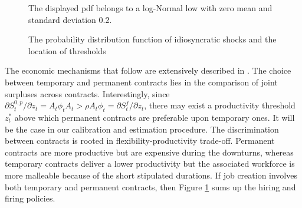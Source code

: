 \begin{figure}[t]
\begin{center}
\end{center}
\caption{The probability distribution function of idiosyncratic shocks and the location of thresholds}
\begin{flushleft}
\small The displayed pdf belongs to a log-Normal low with zero mean and standard deviation 0.2. \normalsize
\end{flushleft}
\label{fig:pdf}
\end{figure}

The economic mechanisms that follow are extensively described in \citet{rion:halshs-02331887}. The choice between temporary and permanent contracts lies in the comparison of joint surpluses across contracts. Interestingly, since $\partial S_t^{0,p} / \partial z_t = A_t \phi_t A_t > \rho A_t \phi_t = \partial S_t^{f} / \partial z_t$, there may exist a productivity threshold $z_t^*$ above which permanent contracts are preferable upon temporary ones. It will be the case in our calibration and estimation procedure. The discrimination between contracts is rooted in flexibility-productivity trade-off. Permanent contracts are more productive but are expensive during the downturns, whereas temporary contracts deliver a lower productivity but the associated workforce is more malleable because of the short stipulated durations. If job creation involves both temporary and permanent contracts, then Figure \ref{fig:pdf} sums up the hiring and firing policies.

